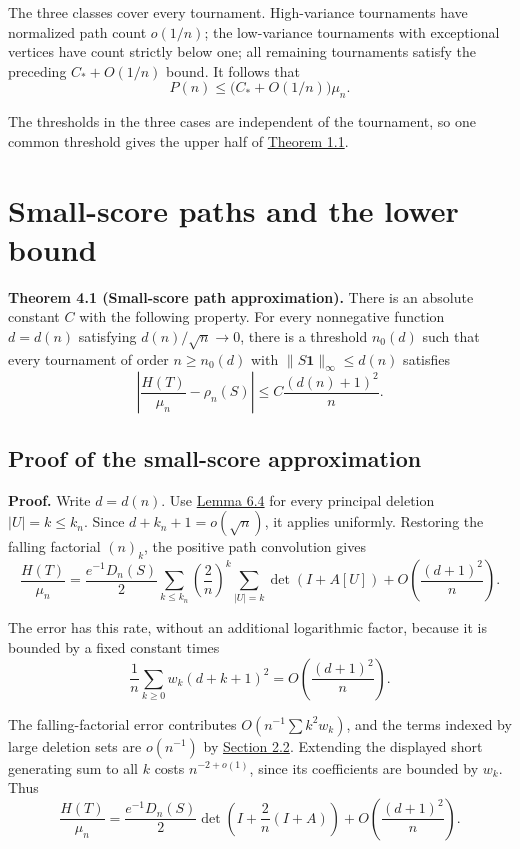 \documentclass[11pt,a4paper]{article}
\makeatletter
\newcommand{\paperstatement}[3]{\par\addvspace{6pt}\Needspace{4\baselineskip}\phantomsection\def\@currentlabel{#2}\label{#3}\noindent\textbf{#1}\enspace}
\newcommand{\paperref}[2]{\hyperref[#1]{#2}}
\makeatother
\begin{document}
The three classes cover every tournament. High-variance tournaments have normalized path count \(o(1/n)\); the low-variance tournaments with exceptional vertices have count strictly below one; all remaining tournaments satisfy the preceding \(C_*+O(1/n)\) bound. It follows that
\[\boxed{P(n)\le\bigl(C_*+O(1/n)\bigr)\mu_n.}\]

The thresholds in the three cases are independent of the tournament, so one common threshold gives the upper half of \paperref{thm-1.1}{Theorem 1.1}.

\section{Small-score paths and the lower bound}\label{sec-4}

\paperstatement{Theorem 4.1 (Small-score path approximation).}{4.1}{thm-4.1} There is an absolute constant \(C\) with the following property. For every nonnegative function \(d=d(n)\) satisfying \(d(n)/\sqrt n\to0\), there is a threshold \(n_0(d)\) such that every tournament of order \(n\ge n_0(d)\) with \(\|S\mathbf1\|_\infty\le d(n)\) satisfies
\[\left|\frac{H(T)}{\mu_n}-\rho_n(S)\right|\le C\frac{(d(n)+1)^2}{n}.\]

\subsection{Proof of the small-score approximation}\label{sec-4.1}

\textbf{Proof.} Write \(d=d(n)\). Use \paperref{thm-6.4}{Lemma 6.4} for every principal deletion \(|U|=k\le k_n\). Since \(d+k_n+1=o(\sqrt n)\), it applies uniformly. Restoring the falling factorial \((n)_k\), the positive path convolution gives
\[\frac{H(T)}{\mu_n}
=\frac{e^{-1}D_n(S)}2
\sum_{k\le k_n}\left(\frac2n\right)^k
\sum_{|U|=k}\det(I+A[U])
+O\left(\frac{(d+1)^2}{n}\right).\]

The error has this rate, without an additional logarithmic factor, because it is bounded by a fixed constant times
\[\frac1n\sum_{k\ge0}w_k(d+k+1)^2
=O\left(\frac{(d+1)^2}{n}\right).\]

The falling-factorial error contributes \(O(n^{-1}\sum k^2w_k)\), and the terms indexed by large deletion sets are \(o(n^{-1})\) by \paperref{sec-2.2}{Section 2.2}. Extending the displayed short generating sum to all \(k\) costs \(n^{-2+o(1)}\), since its coefficients are bounded by \(w_k\). Thus
\[\frac{H(T)}{\mu_n}
=\frac{e^{-1}D_n(S)}2
\det\left(I+\frac2n(I+A)\right)
+O\left(\frac{(d+1)^2}{n}\right).\]
\end{document}
